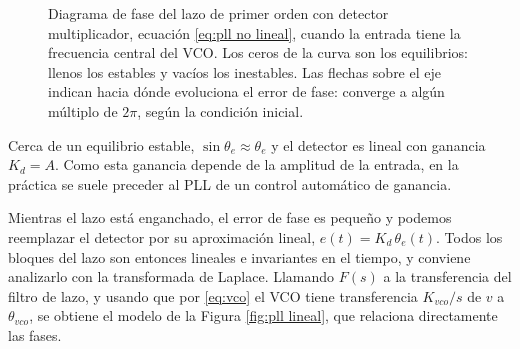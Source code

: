 \begin{figure}
    \begin{center}
    \end{center}
    \caption{Diagrama de fase del lazo de primer orden con detector multiplicador, ecuación \eqref{eq:pll no lineal}, cuando la entrada tiene la frecuencia central del VCO. Los ceros de la curva son los equilibrios: llenos los estables y vacíos los inestables. Las flechas sobre el eje indican hacia dónde evoluciona el error de fase: converge a algún múltiplo de $2\pi$, según la condición inicial.}\label{fig:pll fase}
\end{figure}

Cerca de un equilibrio estable, $\sin\theta_e\approx\theta_e$ y el detector es lineal con ganancia $K_d=A$. Como esta ganancia depende de la amplitud de la entrada, en la práctica se suele preceder al PLL de un control automático de ganancia.

Mientras el lazo está enganchado, el error de fase es pequeño y podemos reemplazar el detector por su aproximación lineal, $e(t)=K_d\,\theta_e(t)$. Todos los bloques del lazo son entonces lineales e invariantes en el tiempo, y conviene analizarlo con la transformada de Laplace. Llamando $F(s)$ a la transferencia del filtro de lazo, y usando que por \eqref{eq:vco} el VCO tiene transferencia $K_{vco}/s$ de $v$ a $\theta_{vco}$, se obtiene el modelo de la Figura \ref{fig:pll lineal}, que relaciona directamente las fases.

